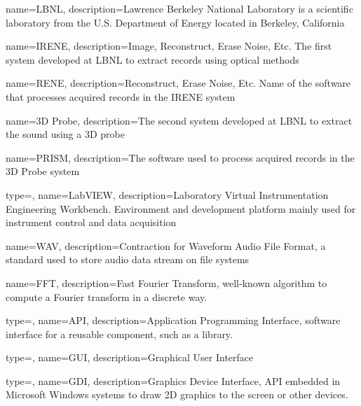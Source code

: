%

{
    name=LBNL,
    description={Lawrence Berkeley National Laboratory is a scientific laboratory from the U.S. Department of Energy located in Berkeley, California}
}

{
    name=IRENE,
    description={Image, Reconstruct, Erase Noise, Etc. The first system developed at LBNL to extract records using optical methods}
}

{
    name=RENE,
    description={Reconstruct, Erase Noise, Etc. Name of the software that processes acquired records in the IRENE system}
}

{
    name=3D Probe,
    description={The second system developed at LBNL to extract the sound using a 3D probe}
}

{
    name=PRISM,
    description={The software used to process acquired records in the 3D Probe system}
}

{
    type=\acronymtype,
    name={LabVIEW},
    description={Laboratory Virtual Instrumentation Engineering Workbench. Environment and development platform mainly used for instrument control and data acquisition}
}

{
    name={WAV},
    description={Contraction for Waveform Audio File Format, a standard used to store audio data stream on file systems}
}

{
    name={FFT},
    description={Fast Fourier Transform, well-known algorithm to compute a Fourier transform in a discrete way.}
}

{
    type=\acronymtype,
    name={API},
    description={Application Programming Interface, software interface for a reusable component, such as a library.}
}

{
    type=\acronymtype,
    name={GUI},
    description={Graphical User Interface}
}

{
    type=\acronymtype,
    name={GDI},
    description={Graphics Device Interface, API embedded in Microsoft Windows systems to draw 2D graphics to the screen or other devices.}
}

